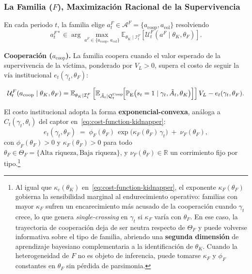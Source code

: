 \documentclass[12pt]{article}
\theoremstyle{definition}
\theoremstyle{remark}
\newcommand{\E}{\mathbb{E}}
\newcommand{\ProbE}{\mathbb{P}_{\mathrm{E}}}
\newcommand{\1}{\mathbf{1}}
\begin{document}
\subsubsection[La familia F]{La Familia ($F$), Maximización Racional de la Supervivencia}
En cada periodo $t$, la familia elige $a_t^F\in\mathcal{A}^F=\{a_{\mathrm{coop}},a_{\mathrm{col}}\}$ resolviendo
\begin{equation}
\label{eq:family-argmax-bayes}
    a_t^{F\ast}
    \in \arg \max_{a^F \in \{a_{\mathrm{coop}},\, a_{\mathrm{col}}\}}
    \E_{\theta_K \mid \mathcal{I}_t^F}
    \left[
    \mathcal{U}^F_t(a^F \mid \theta_K, \theta_F)
    \right].
\end{equation}

\noindent \textbf{Cooperación ($a_{\mathrm{coop}}$).} La familia coopera cuando el valor esperado de la supervivencia de la víctima, ponderado por $V_L>0$, supera el costo de seguir la vía institucional $e_t(\gamma_t,\theta_F)$:

\begin{equation}
    \label{eq:family-utility-coop}
    \mathcal{U}^F_t(a_{\mathrm{coop}}\mid \theta_K,\theta_F)
    =
    \E_{\theta_K \mid \mathcal{I}_t^F}
    \left[
    \E_{\tilde A_t \mid \mathcal Q_t^{\mathrm{Coop}}}\!\Bigl[
      \ProbE\bigl(s_t=1\mid \gamma_t,\tilde A_t,\theta_K\bigr)
    \Bigr]
    \right] V_L
    - e_t(\gamma_t,\theta_F).
\end{equation}

\noindent El costo institucional adopta la forma \textbf{exponencial-convexa}, análoga a $C_t(\gamma_t,\theta_i)$ del captor en~\eqref{eq:cost-function-kidnapper}:
\begin{equation}
    \label{eq:family-institutional-cost}
    e_t(\gamma_t,\theta_F)
    \;=\;
    \phi_F(\theta_F)\,\exp\bigl(\kappa_F(\theta_F)\,\gamma_t\bigr)
    \;+\;
    \nu_F(\theta_F),
\end{equation}
con $\phi_F(\theta_F)>0$ y $\kappa_F(\theta_F)>0$ para todo $\theta_F\in\Theta_F=\{\text{Alta riqueza},\text{Baja riqueza}\}$, y $\nu_F(\theta_F)\in\mathbb{R}$ un corrimiento fijo por tipo.\footnote{Al igual que $\kappa_c(\theta_K)$ en~\eqref{eq:cost-function-kidnapper}, el exponente $\kappa_F(\theta_F)$ gobierna la sensibilidad marginal al endurecimiento operativo: familias con mayor $\kappa_F$ sufren un encarecimiento más acusado de la cooperación cuando $\gamma_t$ crece, lo que genera \textit{single-crossing} en $\gamma_t$ si $\kappa_F$ varía con $\theta_F$. En ese caso, la trayectoria de cooperación deja de ser neutra respecto de $\Theta_F$ y puede volverse informativa sobre el tipo de familia, abriendo una \textbf{segunda dimensión} de aprendizaje bayesiano complementaria a la identificación de $\theta_K$. Cuando la heterogeneidad de $F$ no es objeto de inferencia, puede tomarse $\kappa_F$ y $\phi_F$ constantes en $\theta_F$ sin pérdida de parsimonia.}
\end{document}
